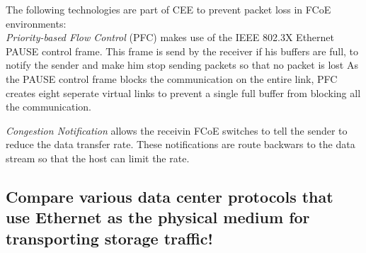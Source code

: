 	The following technologies are part of CEE to prevent packet loss in FCoE environments:\\
	\emph{Priority-based Flow Control} (PFC) makes use of the IEEE 802.3X Ethernet PAUSE control frame.
	This frame is send by the receiver if his buffers are full,
	to notify the sender and make him stop sending packets
	so that no packet is lost
	As the PAUSE control frame blocks the communication on the entire link,
	PFC creates eight seperate virtual links to prevent a single full buffer from blocking
	all the communication.

	\emph{Congestion Notification} allows the receivin FCoE switches to tell the sender to
	reduce the data transfer rate.
	These notifications are route backwars to the data stream so that the host can limit the rate.

\subsection{Compare various data center protocols that use Ethernet as the physical medium for transporting storage traffic!} %
\label{sub:compare_various_data_center_protocols_that_use_ethernet_as_the_physical_medium_for_transporting_storage_traffic}


